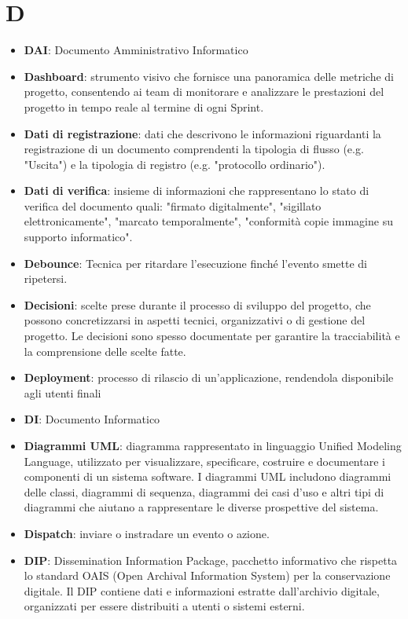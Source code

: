 \documentclass[a4paper,12pt]{article}
\begin{document}
\section{D}
\begin{itemize}
    \item \textbf{DAI}: Documento Amministrativo Informatico
    \item \textbf{Dashboard}: strumento visivo che fornisce una panoramica delle metriche di progetto, consentendo ai team di monitorare e analizzare le prestazioni del progetto in tempo reale al termine di ogni Sprint.
    \item \textbf{Dati di registrazione}: dati che descrivono le informazioni riguardanti la registrazione di un documento comprendenti la tipologia di flusso (e.g. "Uscita") e la tipologia di registro (e.g. "protocollo ordinario").
    \item \textbf{Dati di verifica}: insieme di informazioni che rappresentano lo stato di verifica del documento quali: "firmato digitalmente", "sigillato elettronicamente", "marcato temporalmente", "conformità copie immagine su supporto informatico".
    \item \textbf{Debounce}: Tecnica per ritardare l’esecuzione finché l’evento smette di ripetersi.
    \item \textbf{Decisioni}: scelte prese durante il processo di sviluppo del progetto, che possono concretizzarsi in aspetti tecnici, organizzativi o di gestione del progetto. Le decisioni sono spesso documentate per garantire la tracciabilità e la comprensione delle scelte fatte.
    \item \textbf{Deployment}: processo di rilascio di un'applicazione, rendendola disponibile agli utenti finali
    \item \textbf{DI}: Documento Informatico
    \item \textbf{Diagrammi UML}: diagramma rappresentato in linguaggio Unified Modeling Language, utilizzato per visualizzare, specificare, costruire e documentare i componenti di un sistema software. I diagrammi UML includono diagrammi delle classi, diagrammi di sequenza, diagrammi dei casi d'uso e altri tipi di diagrammi che aiutano a rappresentare le diverse prospettive del sistema.
    \item \textbf{Dispatch}: inviare o instradare un evento o azione.
    \item \textbf{DIP}: Dissemination Information Package, pacchetto informativo che rispetta lo standard OAIS (Open Archival Information System) per la conservazione digitale. Il DIP contiene dati e informazioni estratte dall'archivio digitale, organizzati per essere distribuiti a utenti o sistemi esterni.

\end{itemize}
\end{document}
